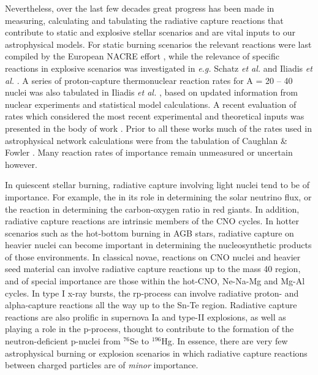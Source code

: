 Nevertheless, over the last few decades great progress has been made in measuring, calculating and tabulating the radiative capture reactions that contribute to static and explosive stellar scenarios and are vital inputs to our astrophysical models.  For static burning scenarios the relevant reactions were last compiled by the European NACRE effort \cite{angu99}, while the relevance of specific reactions in explosive scenarios was investigated in {\it e.g.} Schatz {\it et al.} \cite{scha98} and Iliadis {\it et al.} \cite{ilia02}. A series of proton-capture thermonuclear reaction rates for A = 20 -- 40 nuclei was also tabulated in Iliadis {\it et al.} \cite{ilia01}, based on updated information from nuclear experiments and statistical model calculations. 
A recent evaluation of rates which considered the most recent experimental and theoretical inputs was presented in the body of work \cite{Lon10,Ili10a,Ili10b,Ili10c}.
Prior to all these works much of the rates used in astrophysical network calculations were from the tabulation of Caughlan \& Fowler \cite{caug88}. Many reaction rates of importance remain unmeasured or uncertain however.

In quiescent stellar burning, radiative capture involving light nuclei tend to be of importance. For example, the  in its role in determining the solar neutrino flux, or the  reaction in determining the carbon-oxygen ratio in red giants. In addition, radiative capture reactions are intrinsic members of the CNO cycles. 
In hotter scenarios such as the hot-bottom burning in AGB stars, radiative capture on heavier nuclei can become important in determining the nucleosynthetic products of those environments. 
In classical novae, reactions on CNO nuclei and heavier seed material can involve radiative capture reactions up to the mass 40 region, and of special importance are those within the hot-CNO, Ne-Na-Mg and Mg-Al cycles. In type I x-ray bursts, the rp-process can involve radiative proton- and alpha-capture reactions all the way up to the Sn-Te region. 
Radiative capture reactions are also prolific in supernova Ia and type-II explosions, as well as playing a role in the p-process, thought to contribute to the formation of the neutron-deficient p-nuclei from  $^{76}$Se to $^{196}$Hg. In essence, there are very few astrophysical burning or explosion scenarios in which radiative capture reactions between charged particles are of {\em minor} importance.   

